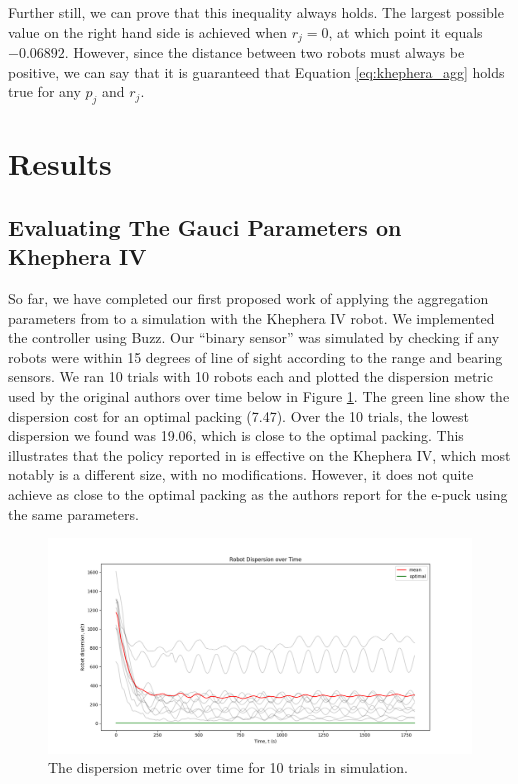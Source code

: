 \documentclass[conference]{IEEEtran}
\begin{document}
  Further still, we can prove that this inequality always holds. The largest possible value on the right hand side is achieved when $r_j=0$, at which point it equals $-0.06892$. However, since the distance between two robots must always be positive, we can say that it is guaranteed that Equation \ref{eq:khephera_agg} holds true for any $p_j$ and $r_j$.


\section{Results}

  \subsection{Evaluating The Gauci Parameters on Khephera IV}

  So far, we have completed our first proposed work of applying the aggregation parameters from \cite{gauci_self-organized_2014} to a simulation with the Khephera IV robot. We implemented the controller using Buzz. Our ``binary sensor'' was simulated by checking if any robots were within 15 degrees of line of sight according to the range and bearing sensors. We ran 10 trials with 10 robots each and plotted the dispersion metric used by the original authors over time below in Figure \ref{fig:dispersion_gauci}. The green line show the dispersion cost for an optimal packing (7.47). Over the 10 trials, the lowest dispersion we found was 19.06, which is close to the optimal packing. This illustrates that the policy reported in \cite{gauci_self-organized_2014} is effective on the Khephera IV, which most notably is a different size, with no modifications. However, it does not quite achieve as close to the optimal packing as the authors report for the e-puck using the same parameters.

  \begin{figure}
    \centering
    \includegraphics[width=1\linewidth]{./images/robot_dispersion_over_10_trials.png}
    \caption{The dispersion metric over time for 10 trials in simulation.}
    \label{fig:dispersion_gauci}
  \end{figure}
\end{document}
